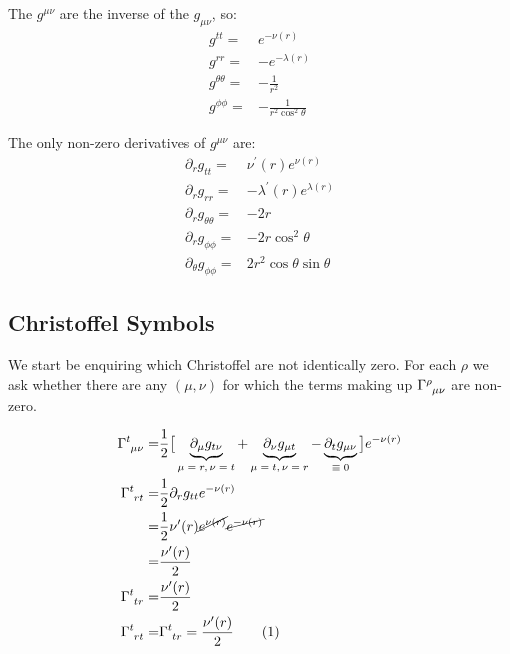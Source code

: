 \documentclass[]{article}
\newcommand\numberthis{\addtocounter{equation}{1}\tag{\theequation}}
\begin{document}
The $g^{\mu\nu}$ are the inverse of the $g_{\mu\nu}$, so: 
\begin{align*}
	g^{tt}=& e^{-\nu(r)}\\
	g^{rr}=&-e^{-\lambda(r)}\\
	g^{\theta\theta}=&-\frac{1}{r^2}\\
	g^{\phi\phi}=&-\frac{1}{r^2 \cos^2 \theta}
\end{align*}

The only non-zero derivatives of $g^{\mu\nu}$ are:
\begin{align*}
	\partial_r g_{tt}=& \nu^\prime(r) e^{\nu(r)}\\
	\partial_r g_{rr}=& -\lambda^\prime(r) e^{\lambda(r)}\\
	\partial_r g_{\theta\theta}=& -2 r\\
	\partial_r g_{\phi\phi}=& -2 r \cos^2 \theta\\
	\partial_\theta g_{\phi\phi}=& 2 r^2 \cos \theta \sin \theta
\end{align*}

\subsection{Christoffel Symbols}

We start be enquiring which Christoffel are not identically zero. For each $\rho$ we ask whether there are any $(\mu,\nu)$ for which the terms making up $\Gamma\indices{^\rho_{\mu\nu}}$ are non-zero.

\begin{align*}
	\Gamma\indices{^t_{\mu\nu}} =&\frac{1}{2} \big[\underbrace{ \partial_\mu g_{t\nu}}_\text{$\mu=r,\nu=t$} + \underbrace{\partial_\nu g_{\mu t}}_\text{$\mu=t,\nu=r$} - \underbrace{\partial_t g_{\mu\nu}}_\text{$\equiv0$}\big] e^{-\nu(r)}\\
	\Gamma\indices{^t_{rt}}=&\frac{1}{2} \partial_r g_{tt}  e^{-\nu(r)}\\
	=&\frac{1}{2}\nu^\prime(r) \cancel{e^{\nu(r)}}\cancel{e^{-\nu(r)}}\\
	=&\frac{\nu^\prime(r)}{2}\\
	\Gamma\indices{^t_{tr}}=&\frac{\nu^\prime(r)}{2}\\
	\Gamma\indices{^t_{rt}}=&\Gamma\indices{^t_{tr}}=\frac{\nu^\prime(r)}{2} \numberthis \label{eq:Gamma:ttr}
\end{align*}
\end{document}
